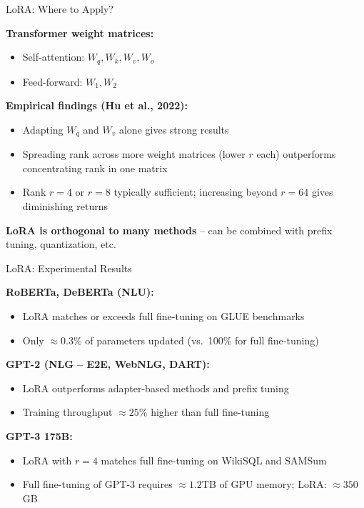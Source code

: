 \documentclass[11pt,compress,t,notes=noshow, xcolor=table]{beamer}
\begin{document}

\begin{frame}{LoRA: Where to Apply?}

\vfill

\textbf{Transformer weight matrices:}
\begin{itemize}
  \item Self-attention: $W_q, W_k, W_v, W_o$
  \item Feed-forward: $W_1, W_2$
\end{itemize}

\vfill

\textbf{Empirical findings (Hu et al., 2022):}
\begin{itemize}
  \item Adapting $W_q$ and $W_v$ alone gives strong results
  \item Spreading rank across more weight matrices (lower $r$ each) outperforms concentrating rank in one matrix
  \item Rank $r = 4$ or $r = 8$ typically sufficient; increasing beyond $r = 64$ gives diminishing returns
\end{itemize}

\vfill

\textbf{LoRA is orthogonal to many methods} -- can be combined with prefix tuning, quantization, etc.

\vfill

\end{frame}


\begin{frame}{LoRA: Experimental Results}

\vfill

\textbf{RoBERTa, DeBERTa (NLU):}
\begin{itemize}
  \item LoRA matches or exceeds full fine-tuning on GLUE benchmarks
  \item Only $\approx 0.3\%$ of parameters updated (vs.\ 100\% for full fine-tuning)
\end{itemize}

\vfill

\textbf{GPT-2 (NLG -- E2E, WebNLG, DART):}
\begin{itemize}
  \item LoRA outperforms adapter-based methods and prefix tuning
  \item Training throughput $\approx 25\%$ higher than full fine-tuning
\end{itemize}

\vfill

\textbf{GPT-3 175B:}
\begin{itemize}
  \item LoRA with $r = 4$ matches full fine-tuning on WikiSQL and SAMSum
  \item Full fine-tuning of GPT-3 requires $\approx 1.2$TB of GPU memory; LoRA: $\approx 350$ GB
\end{itemize}

\vfill

\end{frame}
\end{document}
